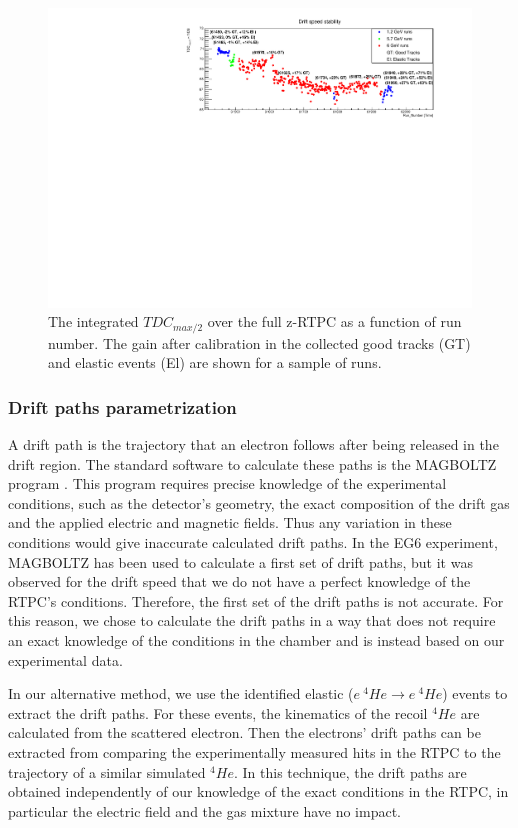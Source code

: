 \begin{figure}[tpb]
\hspace{-0.3in}
\includegraphics[scale=0.9]{fig_rtpc/updates/TDCmax2-run-number.pdf}
\caption{ The integrated $TDC_{max/2}$ over the full z-RTPC as a function of 
run number.  The gain after calibration in the collected good tracks (GT) and 
elastic events (El) are shown for a sample of runs.}
\label{fig:Drift_run_number}
\end{figure} 

\subsubsection{Drift paths parametrization}
A drift path is the trajectory that an electron follows after being 
released in the drift region. The standard software to calculate these paths is 
the MAGBOLTZ program \cite{MAGBOLTZ}. This program requires precise knowledge 
of the experimental conditions, such as the detector's geometry, the exact 
composition of the drift gas and the applied electric and magnetic fields. Thus 
any variation in these conditions would give inaccurate calculated drift paths.  
In the EG6 experiment, MAGBOLTZ has been used to calculate a first set of drift 
paths, but it was observed for the drift speed that we do not have a perfect 
knowledge of the RTPC's conditions. Therefore, the first set of the drift paths 
is not accurate. For this reason, we chose to calculate the drift paths in a 
way that does not require an exact knowledge of the conditions in the chamber 
and is instead based on our experimental data.  

In our alternative method, we use the identified elastic ($e ~ ^{4}He 
\rightarrow e ~ ^{4}He$) events to extract the drift paths. For these events, 
the kinematics of the recoil $^{4}He$ are calculated from the scattered 
electron. Then the electrons' drift paths can be extracted from comparing the 
experimentally measured hits in the RTPC to the trajectory of a similar 
simulated $^{4}He$. In this technique, the drift paths are obtained 
independently of our knowledge of the exact conditions in the RTPC, in 
particular the electric field and the gas mixture have no impact. 

